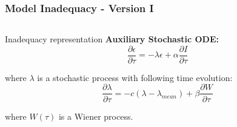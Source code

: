 \documentclass[10pt,xcolor=dvipsnames,compress]{beamer}
\begin{document}
\begin{frame}
\frametitle{Model Inadequacy - Version I}
\vfill


\begin{columns}
\begin{column}{.42\textwidth}
\begin{alertblock}{Inadequacy representation}
\textbf{Auxiliary Stochastic ODE:}
\begin{equation*}
\frac{\partial\epsilon}{\partial\tau} = -\lambda\epsilon + \alpha \frac{\partial I}{\partial\tau}
\end{equation*}

where $\lambda$ is a stochastic process with following time evolution:
\begin{equation*}
\frac{\partial\lambda}{\partial\tau} = -c(\lambda - \lambda_{mean}) + \beta \frac{\partial W}{\partial\tau}
\end{equation*}

where $W(\tau)$ is a Wiener process.%
\end{alertblock}


\end{column}
\end{columns}
\end{frame}
\end{document}
